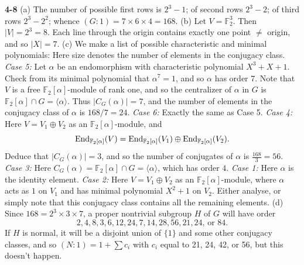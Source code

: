 \documentclass[a4paper,11pt,final,openany]{memoir}%
\theoremstyle{nonumberplain}
\begin{document}
\bigskip\noindent\textbf{4-8}
(a) The number of possible first rows is $2^{3}-1$; of second rows $2^{3}-2$;
of third rows $2^{3}-2^{2}$; whence $(G:1)=7\times6\times4=168$. \noindent(b)
Let $V=\mathbb{F}_{2}^{3}$. Then $|V|=2^{3}=8$. Each line through the origin
contains exactly one point $\neq$ origin, and so $|X|=7$. \noindent(c) We make
a list of possible characteristic and minimal polynomials:
\resizebox{3.3in}{!}{
\begin{minipage}{5in}
\[%
\begin{array}
[c]{lllll}
& \text{Characteristic poly.} & \text{Min'l poly.} & \text{Size} & \text{Order
of element in class}\\
1 & X^{3}+X^{2}+X+1 & X+1 & 1 & 1\\
2 & X^{3}+X^{2}+X+1 & (X+1)^{2} & 21 & 2\\
3 & X^{3}+X^{2}+X+1 & (X+1)^{3} & 42 & 4\\
4 & X^{3}+1=(X+1)(X^{2}+X+1) & \text{Same} & 56 & 3\\
5 & X^{3}+X+1\text{ (irreducible)} & \text{Same} & 24 & 7\\
6 & X^{3}+X^{2}+1\text{ (irreducible)} & \text{Same} & 24 & 7
\end{array}
\]
\end{minipage}
}
Here size denotes the number of elements in the conjugacy class.
\noindent\textit{Case 5:\/} Let $\alpha$ be an endomorphism with
characteristic polynomial $X^{3}+X+1$. Check from its minimal polynomial that
$\alpha^{7}=1$, and so $\alpha$ has order $7$. Note that $V$ is a free
$\mathbb{F}_{2}[\alpha]$-module of rank one, and so the centralizer of
$\alpha$ in $G$ is $\mathbb{F}_{2}[\alpha]\cap G=\langle\alpha\rangle$. Thus
$|C_{G}(\alpha)|=7$, and the number of elements in the conjugacy class of
$\alpha$ is $168/7=24$. \noindent\textit{Case 6:\/} Exactly the same as Case
5. \noindent\textit{Case 4:\/} Here $V=V_{1}\oplus V_{2}$ as an $\mathbb{F}%
_{2}[\alpha]$-module, and
\[
\End_{\mathbb{F}_{2}[\alpha]}(V)=\End_{\mathbb{F}_{2}[\alpha]}(V_{1}%
)\oplus\End_{\mathbb{F}_{2}[\alpha]}(V_{2}).
\]
Deduce that $|C_{G}(\alpha)|=3$, and so the number of conjugates of $\alpha$
is $\frac{168}{3}=56$. \noindent\textit{Case 3:\/} Here $C_{G}(\alpha
)=\mathbb{F}_{2}[\alpha]\cap G=\langle\alpha\rangle$, which has order $4$.
\noindent\textit{Case 1:\/} Here $\alpha$ is the identity element.
\noindent\textit{Case 2:\/} Here $V=V_{1}\oplus V_{2}$ as an $\mathbb{F}%
_{2}[\alpha]$-module, where $\alpha$ acts as $1$ on $V_{1}$ and has minimal
polynomial $X^{2}+1$ on $V_{2}$. Either analyse, or simply note that this
conjugacy class contains all the remaining elements. \noindent(d) Since
$168=2^{3}\times3\times7$, a proper nontrivial subgroup $H$ of $G$ will have
order
\[
2,4,8,3,6,12,24,7,14,28,56,21,24\text{, or }84.
\]
If $H$ is normal, it will be a disjoint union of $\{1\}$ and some other
conjugacy classes, and so $(N:1)=1+\sum c_{i}$ with $c_{i}$ equal to 21, 24,
42, or 56, but this doesn't happen.
\end{document}
